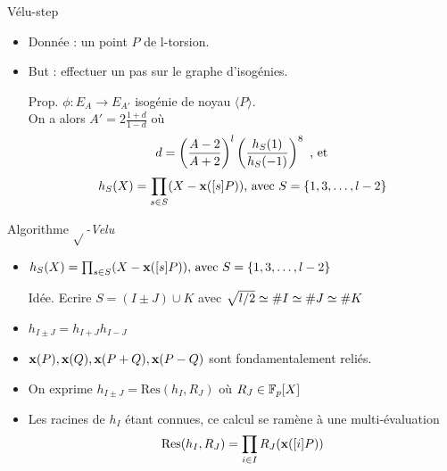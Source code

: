 \documentclass{beamer}
\begin{document}
\begin{frame}[fragile]{Vélu-step}
\begin{itemize}
	\item Donnée : un point $P$ de l-torsion.
	\item But : effectuer un pas sur le graphe d'isogénies.
	\item[Prop.]{$\phi:E_A\rightarrow E_{A'}$ isogénie de noyau $\langle P \rangle$.\\
		On a alors $\boxed{A'=2\frac{1+d}{1-d}}$ où\\
		\[d = \left(\frac{A-2}{A+2}\right)^{\mathnormal{l}} \left( \frac{h_S(1)}{h_S(-1)}\right)^8 \text{ , et}\]
			\[h_S(X) = \prod_{s\in S}(X-\textbf{x}([s]P))\text{, avec }S=\{1,3, \ldots, \mathnormal{l}-2\}\]}
\end{itemize}
\end{frame}

\begin{frame}[fragile]{Algorithme $\sqrt{}$\textit{-Velu}}
	\begin{itemize}
		\item{$h_S(X) = \prod_{s\in S}(X-\textbf{x}([s]P))\text{, avec }S=\{1,3, \ldots, \mathnormal{l}-2\}$}
		\item[Idée.] {Ecrire $S=(I\pm J) \cup K$} avec $\sqrt{\mathnormal{l}/2}\simeq \#I \simeq \#J \simeq \#K$
		\item{$h_{I\pm J} = h_{I+J} h_{I-J}$}
		\item{$\textbf{x}(P), \textbf{x}(Q), \textbf{x}(P+Q), \textbf{x}(P-Q)$ sont fondamentalement reliés.}
		\item{On exprime $h_{I\pm J}=\text{Res}(h_I, R_J)$ où $R_J\in\mathbb{F}_p[X]$}
		\item{Les racines de $h_I$ étant connues, ce calcul se ramène à une multi-évaluation
			\[\text{Res}(h_I, R_J)=\prod_{i\in I}R_J(\textbf{x}([i]P))\]}
	\end{itemize}
\end{frame}
\end{document}
